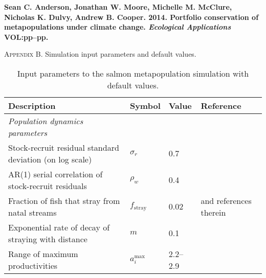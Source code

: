\documentclass[12pt]{article}
\begin{document}
\textbf{Sean C. Anderson, Jonathan W. Moore, Michelle M. McClure, Nicholas K. Dulvy, Andrew B. Cooper. 2014. Portfolio conservation of metapopulations under climate change. \textit{Ecological Applications} VOL:pp--pp.}

\bigskip

\textsc{Appendix B.} Simulation input parameters and default values.

\bigskip

\renewcommand{\thetable}{B\arabic{table}}

\begin{table}[h!]
\centering
\footnotesize
\caption{Input parameters to the salmon metapopulation simulation with default values.}
\smallskip
\begin{tabular}{>{\RaggedRight}p{7.8cm}p{1.1cm}p{2.5cm}>{\RaggedRight}p{3.3cm}}
\toprule
Description                                                          & Symbol                & Value                  & Reference  \\
\midrule

\textit{Population dynamics parameters}                              &                       &                        &             \\
Stock-recruit residual standard deviation (on log scale)             & $\sigma_r$            & 0.7                    & \citep{thorson2014a}  \\
AR(1) serial correlation of stock-recruit residuals                  & $\rho_w$              & 0.4                    & \citep{thorson2014a}  \\
Fraction of fish that stray from natal streams                       & $f_{\mathrm{stray}}$  & 0.02                   & \citep{quinn2005} and references therein  \\
Exponential rate of decay of straying with distance                  & $m$                   & 0.1                    & \citep{cooper1999}      \\
Range of maximum productivities                                      & $a_i^{\mathrm{max}}$  & 2.2--2.9             &  \citep{dorner2008}   \\


\end{tabular}
\end{table}
\end{document}

